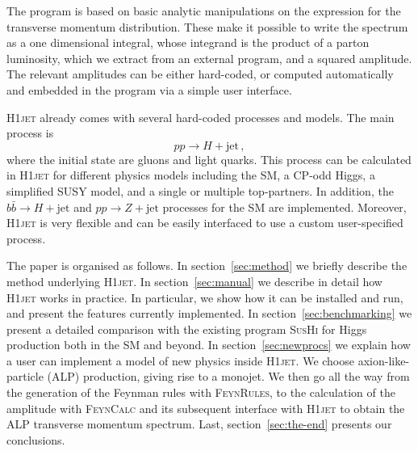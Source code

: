 \documentclass[12pt]{article}
\begin{document}
The program is based on basic analytic manipulations on the expression
for the transverse momentum distribution. These make it possible to
write the spectrum as a one dimensional integral, whose integrand is
the product of a parton luminosity, which we extract from an external
program, and a squared amplitude. The relevant amplitudes can be
either hard-coded, or computed automatically and embedded in the program
via a simple user interface.

\textsc{H1jet} already comes with several hard-coded processes and models. 
The main process is 
\begin{equation}
    pp \to H + \mathrm{jet} \,, 
\end{equation}
where the initial state are gluons and light quarks. This process can be calculated in \textsc{H1jet} for different physics models including the SM, a CP-odd Higgs, a simplified SUSY model, and a single or multiple top-partners. In addition, the $b\bar{b} \to H + \mathrm{jet}$ and $pp \to Z + \mathrm{jet}$ processes for the SM are implemented. Moreover, \textsc{H1jet} is very flexible and can be easily interfaced to use a custom user-specified process. 

The paper is organised as follows. In section~\ref{sec:method} we
briefly describe the method underlying \textsc{H1jet}. In
section~\ref{sec:manual} we describe in detail how \textsc{H1jet}
works in practice. In particular, we show how it can be installed and
run, and present the features currently implemented. In
section~\ref{sec:benchmarking} we present a detailed comparison with
the existing program \textsc{SusHi} for Higgs production both in the
SM and beyond. In section~\ref{sec:newprocs} we explain how a user can
implement a model of new physics inside \textsc{H1jet}. We choose axion-like-particle 
(ALP) production, giving rise to a monojet. We then go all the way from the
generation of the Feynman rules with \textsc{FeynRules}, to the
calculation of the amplitude with \textsc{FeynCalc} and its subsequent
interface with \textsc{H1jet} to obtain the ALP transverse momentum
spectrum. Last, section~\ref{sec:the-end} presents our conclusions.
\end{document}
